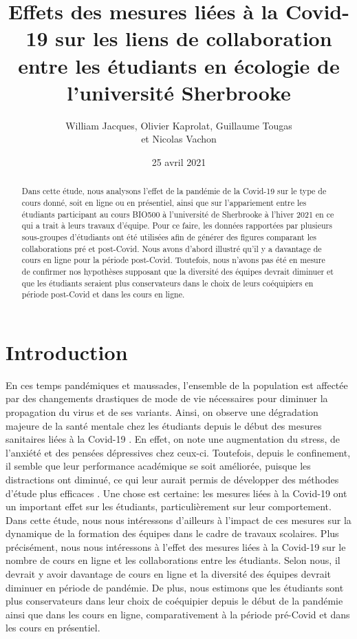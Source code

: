 \documentclass{article}
\title{Effets des mesures liées à la Covid-19 sur les liens de collaboration entre les étudiants en écologie de l'université Sherbrooke}
\author{William Jacques, Olivier Kaprolat, Guillaume Tougas \\ et Nicolas Vachon}
\date{25 avril 2021}
\begin{document}
\maketitle

\begin{abstract}
Dans cette étude, nous analysons l'effet de la pandémie de la Covid-19 sur le type de cours donné, soit en ligne ou en présentiel, ainsi que sur l'appariement entre les étudiants participant au cours BIO500 à l'université de Sherbrooke à l'hiver 2021 en ce qui a trait à leurs travaux d'équipe. Pour ce faire, les données rapportées par plusieurs sous-groupes d'étudiants ont été utilisées afin de générer des figures comparant les collaborations pré et post-Covid. Nous avons d'abord illustré qu'il y a davantage de cours en ligne pour la période post-Covid. Toutefois, nous n'avons pas été en mesure de confirmer nos hypothèses supposant que la diversité des équipes devrait diminuer et que les étudiants seraient plus conservateurs dans le choix de leurs coéquipiers en période post-Covid et dans les cours en ligne.
\end{abstract}

\section{Introduction}
En ces temps pandémiques et maussades, l’ensemble de la population est affectée par des changements drastiques de mode de vie nécessaires pour diminuer la propagation du virus et de ses variants. Ainsi, on observe une dégradation majeure de la santé mentale chez les étudiants depuis le début des mesures sanitaires liées à la Covid-19 \cite{son_effects_2020}. En effet, on note une augmentation du stress, de l’anxiété et des pensées dépressives chez ceux-ci. Toutefois, depuis le confinement, il semble que leur performance académique se soit améliorée, puisque les distractions ont diminué, ce qui leur aurait permis de développer des méthodes d'étude plus efficaces \cite{gonzalez_influence_2020}. Une chose est certaine: les mesures liées à la Covid-19 ont un important effet sur les étudiants, particulièrement sur leur comportement. Dans cette étude, nous nous intéressons d’ailleurs à l’impact de ces mesures sur la dynamique de la formation des équipes dans le cadre de travaux scolaires. Plus précisément, nous nous intéressons à l’effet des mesures liées à la Covid-19 sur le nombre de cours en ligne et les collaborations entre les étudiants. Selon nous, il devrait y avoir davantage de cours en ligne et la diversité des équipes devrait diminuer en période de pandémie. De plus, nous estimons que les étudiants sont plus conservateurs dans leur choix de coéquipier depuis le début de la pandémie ainsi que dans les cours en ligne, comparativement à la période pré-Covid et dans les cours en présentiel. 
\end{document}
